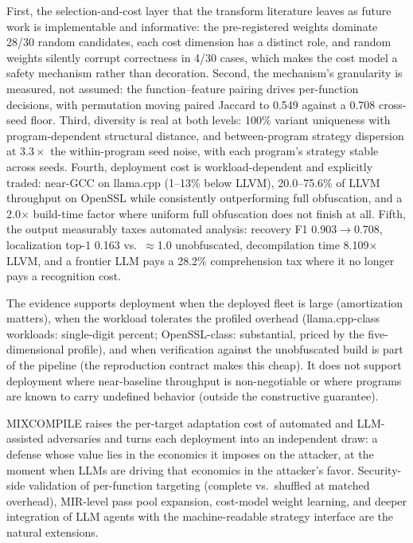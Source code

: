 \documentclass[5p,times,authoryear]{elsarticle}
\theoremstyle{plain}
\theoremstyle{definition}
\theoremstyle{remark}
\begin{document}
First, the selection-and-cost layer that the transform literature leaves as future
work is implementable and informative: the pre-registered weights dominate 28/30
random candidates, each cost dimension has a distinct role, and random weights
silently corrupt correctness in 4/30 cases, which makes the cost model a safety
mechanism rather than decoration. Second, the mechanism's granularity is measured,
not assumed: the function--feature pairing drives per-function decisions, with
permutation moving paired Jaccard to 0.549 against a 0.708 cross-seed floor. Third,
diversity is real at both levels: 100\% variant uniqueness with program-dependent
structural distance, and between-program strategy dispersion at $3.3\times$ the
within-program seed noise, with each program's strategy stable across seeds. Fourth,
deployment cost is workload-dependent and explicitly traded: near-GCC on llama.cpp
(1--13\% below LLVM), 20.0--75.6\% of LLVM throughput on OpenSSL while consistently
outperforming full obfuscation, and a 2.0$\times$ build-time factor where uniform
full obfuscation does not finish at all. Fifth, the output measurably taxes
automated analysis: recovery F1 0.903$\to$0.708, localization top-1 0.163 vs.\
$\approx$1.0 unobfuscated, decompilation time 8.109$\times$ LLVM, and a frontier
LLM pays a 28.2\% comprehension tax where it no longer pays a recognition cost.

The evidence supports deployment when the deployed fleet is large (amortization
matters), when the workload tolerates the profiled overhead (llama.cpp-class
workloads: single-digit percent; OpenSSL-class: substantial, priced by the
five-dimensional profile), and when verification against the unobfuscated build is
part of the pipeline (the reproduction contract makes this cheap). It does not
support deployment where near-baseline throughput is non-negotiable or where
programs are known to carry undefined behavior (outside the constructive
guarantee).

MIXCOMPILE raises the per-target adaptation cost of automated and LLM-assisted
adversaries and turns each deployment into an independent draw: a defense whose
value lies in the economics it imposes on the attacker, at the moment when
LLMs are driving that economics in the attacker's favor. Security-side
validation of per-function targeting (complete vs.\ shuffled at matched overhead),
MIR-level pass pool expansion, cost-model weight learning, and deeper integration
of LLM agents with the machine-readable strategy interface are the natural
extensions.
\end{document}
